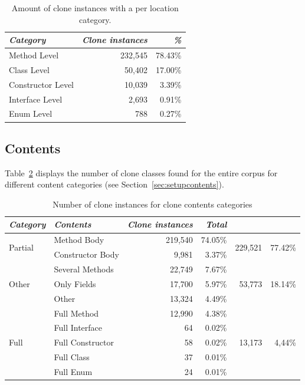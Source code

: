 \documentclass[runningheads]{llncs}
\begin{document}
\begin{table}[H]
\centering
\begin{tabular}{@{}lrr@{}}
\toprule
\textit{\textbf{Category}} & \textit{\textbf{Clone instances}} & \textit{\textbf{\%}} \\ \midrule
Method Level & 232,545 & 78.43\% \\
Class Level & 50,402 & 17.00\% \\
Constructor Level & 10,039 & 3.39\% \\
Interface Level & 2,693 & 0.91\% \\
Enum Level & 788 & 0.27\% \\
\end{tabular}
\caption{Amount of clone instances with a per location category.}
\label{tab:location}
\end{table}

\subsection{Contents}
Table~\ref{tab:contents} displays the number of clone classes found for the entire corpus for different content categories (see Section~\ref{sec:setupcontents}).

\begin{table}[H]
\centering
\begin{tabular}{@{}llrrrr@{}}
\toprule
\textit{\textbf{Category}} & \textit{\textbf{Contents}} & \textit{\textbf{Clone instances}} & \textit{\textbf{Total}} \\ \midrule
\multirow{2}{*}{Partial} & Method Body & 219,540 & 74.05\% & \multirow{2}{*}{229,521}& \multirow{2}{*}{77.42\%} \\ \cmidrule(lr){2-4}
 & Constructor Body & 9,981 & 3.37\% & & \\ \midrule
\multirow{3}{*}{Other} & Several Methods & 22,749 & 7.67\% & \multirow{3}{*}{53,773} & \multirow{3}{*}{18.14\%} \\ \cmidrule(lr){2-4}
 & Only Fields & 17,700 & 5.97\% & & \\ \cmidrule(lr){2-4}
 & Other & 13,324 & 4.49\% & & \\ \midrule
 \multirow{5}{*}{Full} & Full Method & 12,990 & 4.38\% & \multirow{5}{*}{13,173}& \multirow{5}{*}{4,44\%} \\ \cmidrule(lr){2-4}
  & Full Interface & 64 & 0.02\% & & \\ \cmidrule(lr){2-4}
  & Full Constructor & 58 & 0.02\% & & \\ \cmidrule(lr){2-4}
  & Full Class & 37 & 0.01\% & & \\ \cmidrule(lr){2-4}
  & Full Enum & 24 & 0.01\% & & \\ \bottomrule
\end{tabular}
\caption{Number of clone instances for clone contents categories}
\label{tab:contents}
\end{table}
\end{document}
